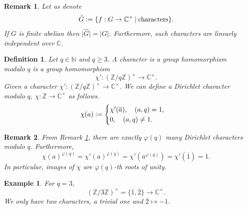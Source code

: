 \documentclass{article}
\newtheorem{definition}{Definition}[section]
\newtheorem{remark}{Remark}[section]
\newtheorem{example}{Example}[section]
\newcommand{\defeq}{\vcentcolon=}
\newcommand{\N}[0]{\mathbb{N}}
\newcommand{\Z}[0]{\mathbb{Z}}
\newcommand{\C}[0]{\mathbb{C}}
\begin{document}
\begin{remark}
  Let us denote 
  \begin{equation*}
    \hat{G} \defeq \{f:G\to \C^\times \:|\: \text{characters}\}.
  \end{equation*}
  If $G$ is finite abelian then $\vert \hat{G}\vert = \vert G\vert$. Furthermore, such characters are linearly independent over $\C$.
  \label{cardinality_finite_abelian_character}
\end{remark}

\begin{definition}
  Let $q\in\N$ and $q\geq 3$. A character is a group homomorphism modulo $q$ is a group homomorphism
  \begin{equation*}
    \chi':(\Z/q\Z)^\times\to \C^\times.
  \end{equation*}
  Given a character $\chi':(\Z/q\Z)^\times \to \C^\times$. We can define a Dirichlet character modulo $q$, $\chi:\Z\to\C^\times $ as follows.
  \begin{equation*}
    \chi(a) \defeq \begin{cases}
      \chi'(\overline{a}), \quad (a,q)=1,\\
      0,\quad (a,q) \not=1.
    \end{cases}
  \end{equation*}
\end{definition}

\begin{remark}
  From Remark \ref{cardinality_finite_abelian_character}, there are exactly $\varphi(q)$ many Dirichlet characters modulo $q$. Furthermore, 
  \begin{equation*}
    \chi(a)^{\varphi(q)} = \chi'(\overline{a})^{\varphi(q)} = \chi'(\overline{a}^{\varphi(q)}) = \chi'(\overline{1}) = 1.
  \end{equation*}
  In particular, images of $\chi$ are $\varphi(q)$-th roots of unity.
  \label{cardinality_dirichlet_characters}
\end{remark}

\begin{example}
  For $q=3$, 
  \begin{equation*}
    (\Z/3\Z)^\times = \{\overline{1},\overline{2}\}\to\C^\times. 
  \end{equation*}
  We only have two characters, a trivial one and $\overline{2}\mapsto -1$.
\end{example}
\end{document}
